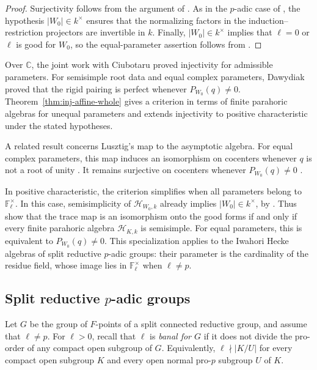 \documentclass[11pt,letterpaper]{amsart}
\theoremstyle{definition}
\numberwithin{equation}{section}
\numberwithin{theorem}{section}
\newcommand{\kk}{k}
\newcommand{\CC}{\mathbb C}
\newcommand{\cH}{\mathcal H}
\begin{document}
\begin{proof}
Surjectivity follows from the argument of \cite[Theorem~8.5]{CH}.
As in the $p$-adic case of \cite[\S6]{CHIII}, the hypothesis
$|W_0|\in\kk^\times$ ensures that the normalizing factors in
the induction--restriction projectors are invertible in $\kk$.
Finally, $|W_0|\in\kk^\times$ implies that $\ell=0$
or $\ell$ is good for $W_0$, so the equal-parameter
assertion follows from
.
\end{proof}

Over $\CC$, the joint work with Ciubotaru
\cite[Definition~6.6 and Theorem~8.2]{CH}
proved injectivity for admissible parameters.
For semisimple root data and equal complex parameters,
Dawydiak \cite[Theorem~9]{DawRig} proved that the rigid
pairing is perfect whenever $P_{W_0}(q)\ne0$.
Theorem~\ref{thm:inj-affine-whole} gives a criterion
in terms of finite parahoric algebras for unequal parameters and extends injectivity to positive characteristic under the stated hypotheses.

A related result concerns Lusztig's map to the
asymptotic algebra.
For equal complex parameters, this map induces an
isomorphism on cocenters whenever $q$ is not a root
of unity \cite[Theorem~1 and Appendix]{BDD23}.
It remains surjective on cocenters whenever
$P_{W_0}(q)\ne0$ \cite[Remark~2]{BDD23}.

In positive characteristic, the criterion simplifies
when all parameters belong to $\mathbb F_\ell^\times$.
In this case, semisimplicity of $\cH_{W_0,\kk}$
already implies $|W_0|\in\kk^\times$, by
\cite[Proposition~5.3 and the table in \S5.2]{GR}.
Thus 
show that the trace map is an isomorphism onto the
good forms if and only if every finite parahoric
algebra $\cH_{K,\kk}$ is semisimple.
For equal parameters, this is equivalent to
$P_{W_0}(q)\ne0$.
This specialization applies to the Iwahori Hecke
algebras of split reductive $p$-adic groups:
their parameter is the cardinality of the residue field,
whose image lies in $\mathbb F_\ell^\times$
when $\ell\ne p$.

\subsection{Split reductive \texorpdfstring{$p$}{p}-adic groups}
\label{subsec:injectivity-split}

Let $G$ be the group of $F$-points of a split
connected reductive group, and assume that $\ell\ne p$.
For $\ell>0$, recall that $\ell$ is \emph{banal for $G$}
if it does not divide the pro-order of any compact
open subgroup of $G$.
Equivalently, $\ell\nmid |K/U|$ for every compact
open subgroup $K$ and every open normal pro-$p$
subgroup $U$ of $K$.
\end{document}
